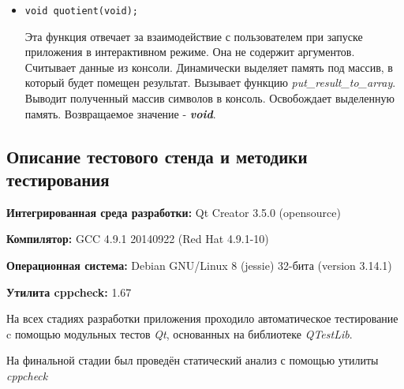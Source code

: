 \documentclass[12pt,a4paper]{report}
\begin{document}
\begin{enumerate}
\begin{itemize}
\item \verb-void quotient(void);-

Эта функция отвечает за взаимодействие с пользователем при запуске приложения в интерактивном режиме. Она не содержит аргументов. Считывает данные из консоли. Динамически выделяет память под массив, в который будет помещен результат. Вызывает функцию \textit{put\_result\_to\_array}. Выводит полученный массив символов в консоль. Освобождает выделенную память. Возвращаемое значение - \textit{\textbf{void}}.
\end{itemize}
\end{enumerate}
\subsection{Описание тестового стенда и методики тестирования}

\begin{flushleft}
\textbf{Интегрированная среда разработки:} Qt Creator 3.5.0 (opensource)

\textbf{Компилятор:} GCC 4.9.1 20140922 (Red Hat 4.9.1-10)

\textbf{Операционная система:} Debian GNU/Linux 8 (jessie) 32-бита (version 3.14.1)

\textbf{Утилита cppcheck:} 1.67
\end{flushleft}

На всех стадиях разработки приложения проходило автоматическое тестирование c помощью модульных тестов \textit{Qt}, основанных на библиотеке  \textit{QTestLib}.

На финальной стадии был проведён статический анализ с помощью утилиты \textit{cppcheck}%
\end{document}
